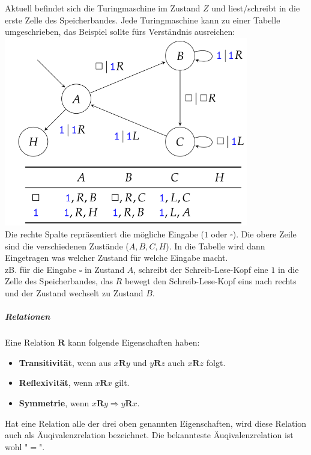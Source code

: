 \documentclass[12pt]{article}
\begin{document}
\begin{flushleft}
    Aktuell befindet sich die Turingmaschine im Zustand $Z$ und liest/schreibt in die erste Zelle des Speicherbandes.
    \linebreak \linebreak
    Jede Turingmaschine kann zu einer Tabelle umgeschrieben, das Beispiel sollte fürs Verständnis ausreichen:
    \includegraphics[width=0.8\textwidth]{turing_table.png} \\
    Die rechte Spalte repräsentiert die mögliche Eingabe ($1$ oder $\square$). Die obere Zeile sind die verschiedenen Zustände ($A,B,C,H$).
    In die Tabelle wird dann Eingetragen was welcher Zustand für welche Eingabe macht. \\
    zB. für die Eingabe $\square$ in Zustand $A$, schreibt der Schreib-Lese-Kopf eine $1$ in die Zelle des Speicherbandes, das $R$ bewegt den Schreib-Lese-Kopf eins nach rechts und der Zustand wechselt zu Zustand $B$.
\end{flushleft}
\subparagraph{\large Relationen}
\normalsize
\begin{flushleft}
    Eine Relation $\mathbf{R}$ kann folgende Eigenschaften haben:
\begin{itemize}
    \item \textbf{Transitivität}, wenn aus $x\mathbf{R}y$ und $y\mathbf{R}z$ auch $x\mathbf{R}z$ folgt.
    \item \textbf{Reflexivität}, wenn $x\mathbf{R}x$ gilt.
    \item \textbf{Symmetrie}, wenn $x\mathbf{R}y \Rightarrow y\mathbf{R}x$.
\end{itemize}
Hat eine Relation alle der drei oben genannten Eigenschaften, wird diese Relation auch als Äuqivalenzrelation bezeichnet.
Die bekannteste Äuqivalenzrelation ist wohl "$=$".
\end{flushleft}
\end{document}
